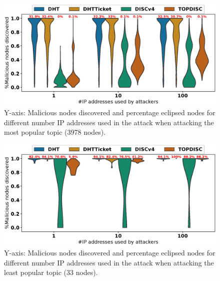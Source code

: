 \begin{figure}[!h]
\includegraphics[width=\linewidth]{results/security/violin_sybilSize_percentageMaliciousDiscovered_t0.eps}
\caption{Y-axis: Malicious nodes discovered and percentage eclipsed nodes for different number IP addresses used in the attack when attacking the most popular topic (3978 nodes).}
\label{fig:eclipse_sybil_t0}
\end{figure}



\begin{figure}[!h]
\includegraphics[width=\linewidth]{results/security/violin_sybilSize_percentageMaliciousDiscovered_t299.eps}
\caption{Y-axis: Malicious nodes discovered and percentage eclipsed nodes for different number IP addresses used in the attack when attacking the least popular topic (33 nodes).}
\label{fig:eclipse_sybil_t299}
\end{figure}








